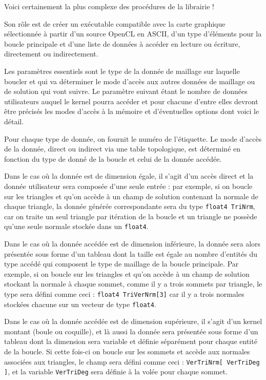 \documentclass[a4paper,12pt]{article}
\begin{document}
Voici certainement la plus complexe des procédures de la librairie !

Son rôle est de créer un exécutable compatible avec la carte graphique sélectionnée à partir d'un source OpenCL en ASCII, d'un type d’éléments pour la boucle principale et d'une liste de données à accéder en lecture ou écriture, directement ou indirectement.

Les paramètres essentiels sont le type de la donnée de maillage sur laquelle boucler et qui va déterminer le mode d'accès aux autres données de maillage ou de solution qui vont suivre.
Le paramètre suivant étant le nombre de données utilisateurs auquel le kernel pourra accéder et pour chacune d'entre elles devront être précisés les modes d'accès à la mémoire et d'éventuelles options dont voici le détail.

Pour chaque type de donnée, on fournit le numéro de l'étiquette.
Le mode d'accès de la donnée, direct ou indirect via une table topologique, est déterminé en fonction du type de donné de la boucle et celui de la donnée accédée.

Dans le cas où la donnée est de dimension égale, il s'agit d'un accès direct et la donnée utilisateur sera composée d'une seule entrée : par exemple, si on boucle sur les triangles et qu'on accède à un champ de solution contenant la normale de chaque triangle, la donnée générée correspondante sera du type {\tt float4 TriNrm}, car on traite un seul triangle par itération de la boucle et un triangle ne possède qu'une seule normale stockée dans un {\tt float4}.

Dans le cas où la donnée accédée est de dimension inférieure, la donnée sera alors présentée sous forme d'un tableau dont la taille est égale au nombre d'entités du type accédé qui composent le type de maillage de la boucle principale. Par exemple, si on boucle sur les triangles et qu'on accède à un champ de solution stockant la normale à chaque sommet, comme il y a trois sommets par triangle, le type sera défini comme ceci : {\tt float4 TriVerNrm[3]} car il y a trois normales stockées chacune sur un vecteur de type {\tt float4}.

Dans le cas où la donnée accédée est de dimension supérieure, il s'agit d'un kernel montant (boule ou coquille), et là aussi la donnée sera présentée sous forme d'un tableau dont la dimension sera variable et définie séparément pour chaque entité de la boucle. Si cette fois-ci on boucle sur les sommets et accède aux normales associées aux triangles, le champ sera défini comme ceci : {\tt VerTriNrm[ VerTriDeg ]}, et la variable {\tt VerTriDeg} sera définie à la volée pour chaque sommet.
\end{document}
